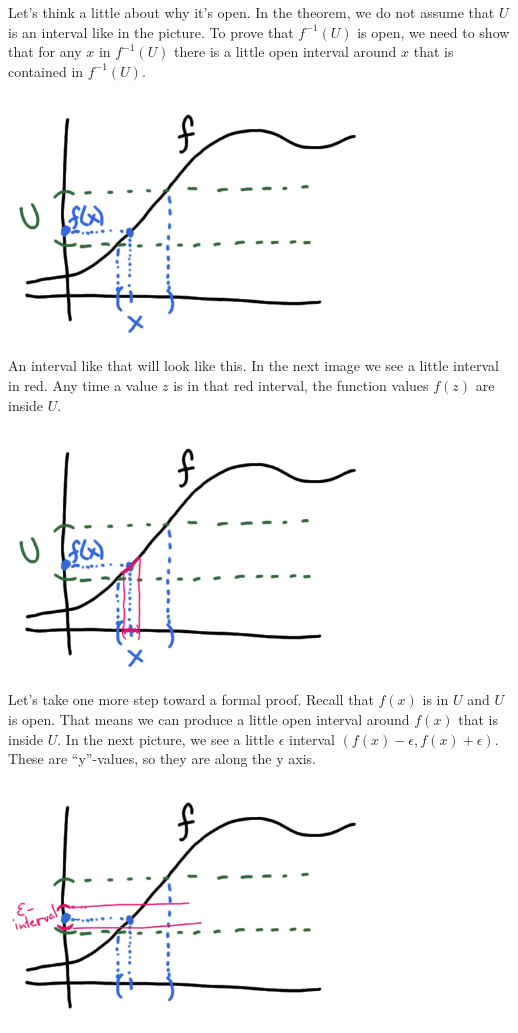 \documentclass[11pt]{book}
\numberwithin{example}{chapter}
\begin{document}
Let's think a little about why it's open.  In the theorem, we do not assume that $U$ is an interval like in the picture.  To prove that $f^{-1}(U)$ is open, we need to show that for any $x$ in $f^{-1}(U)$ there is a little open interval around $x$ that is contained in $f^{-1}(U)$.

\begin{center}
\includegraphics[width=4in]{toplec1_5.png}
\end{center}


An interval like that will look like this.  In the next image we see a little interval in red.  Any time a value $z$ is in that red interval, the function values $f(z)$ are inside $U$.  

\begin{center}
\includegraphics[width=4in]{toplec1_6.png}
\end{center}

Let's take one more step toward a formal proof.  Recall that $f(x)$ is in $U$ and $U$ is open.  That means we can produce a little open interval around $f(x)$ that is inside $U$.  In the next picture, we see a little $\epsilon$ interval $(f(x)-\epsilon, f(x)+\epsilon)$.  These are ``y''-values, so they are along the y axis.  

\begin{center}
\includegraphics[width=4in]{toplec1_7.png}
\end{center}
\end{document}
